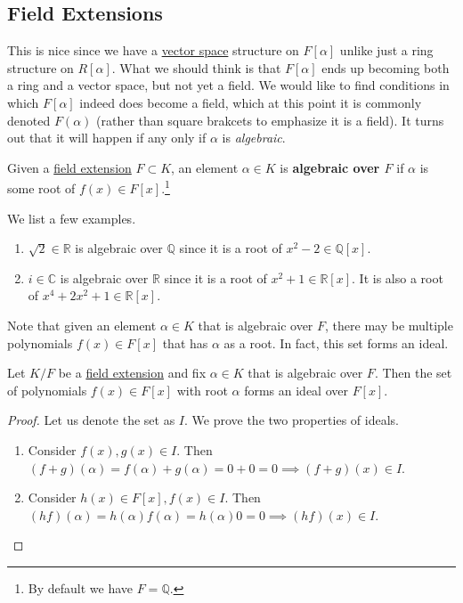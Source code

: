 \subsection{Field Extensions}

  This is nice since we have a \hyperref[def:vector-space]{vector space} structure on $F[\alpha]$ unlike just a ring structure on $R[\alpha]$. What we should think is that $F[\alpha]$ ends up becoming both a ring and a vector space, but not yet a field. We would like to find conditions in which $F[\alpha]$ indeed does become a field, which at this point it is commonly denoted $F(\alpha)$ (rather than square brakcets to emphasize it is a field). It turns out that it will happen if any only if $\alpha$ is \textit{algebraic}.  

  \begin{definition}
    \label{def:algebraic-numbers}
    Given a \hyperref[def:field-extension]{field extension} $F \subset K$, an element $\alpha \in K$ is \textbf{algebraic over $F$} if $\alpha$ is some root of $f(x) \in F[x]$.\footnote{By default we have $F = \mathbb{Q}$.}
  \end{definition}

  \begin{example}
    \label{ex:algebraic-numbers}
    We list a few examples. 
    \begin{enumerate}
      \item $\sqrt{2} \in \mathbb{R}$ is algebraic over $\mathbb{Q}$ since it is a root of $x^2 - 2 \in \mathbb{Q}[x]$. 
      \item $i \in \mathbb{C}$ is algebraic over $\mathbb{R}$ since it is a root of $x^2 + 1 \in \mathbb{R}[x]$. It is also a root of $x^4 + 2 x^2 + 1 \in \mathbb{R}[x]$. 
    \end{enumerate}
  \end{example}

  Note that given an element $\alpha \in K$ that is algebraic over $F$, there may be multiple polynomials $f(x) \in F[x]$ that has $\alpha$ as a root. In fact, this set forms an ideal. 

  \begin{lemma}
    \label{thm:polynomials-vanishing-at-alpha-forms-an-ideal}
    Let $K/F$ be a \hyperref[def:field-extension]{field extension} and fix $\alpha \in K$ that is algebraic over $F$. Then the set of polynomials $f(x) \in F[x]$ with root $\alpha$ forms an ideal over $F[x]$. 
  \end{lemma}
  \begin{proof}
    Let us denote the set as $I$. We prove the two properties of ideals.  
    \begin{enumerate}
      \item Consider $f(x), g(x) \in I$. Then $(f + g)(\alpha) = f(\alpha) + g(\alpha) = 0 + 0 = 0 \implies (f + g)(x) \in I$. 
      \item Consider $h(x) \in F[x], f(x) \in I$. Then $(hf)(\alpha) = h(\alpha) f(\alpha) = h(\alpha) 0 = 0 \implies (hf)(x) \in I$. 
    \end{enumerate}
  \end{proof}


